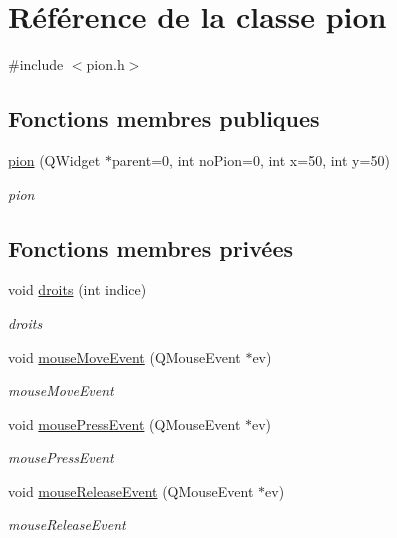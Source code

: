 \hypertarget{classpion}{\section{Référence de la classe pion}
\label{classpion}
}


{\ttfamily \#include $<$pion.\-h$>$}

\subsection*{Fonctions membres publiques}
\begin{DoxyCompactItemize}
\item 
\hyperlink{classpion_af29e3925ea85d612aea7e659254f401b}{pion} (Q\-Widget $\ast$parent=0, int no\-Pion=0, int x=50, int y=50)
\begin{DoxyCompactList}\small\item\em pion \end{DoxyCompactList}\end{DoxyCompactItemize}
\subsection*{Fonctions membres privées}
\begin{DoxyCompactItemize}
\item 
void \hyperlink{classpion_a14da0a4cb182706ced199d4f8d61dcd9}{droits} (int indice)
\begin{DoxyCompactList}\small\item\em droits \end{DoxyCompactList}\item 
void \hyperlink{classpion_a28e0a7d35ac53067f27a00152f221b60}{mouse\-Move\-Event} (Q\-Mouse\-Event $\ast$ev)
\begin{DoxyCompactList}\small\item\em mouse\-Move\-Event \end{DoxyCompactList}\item 
void \hyperlink{classpion_a44680c9f0758100216aaf61f696f8cc5}{mouse\-Press\-Event} (Q\-Mouse\-Event $\ast$ev)
\begin{DoxyCompactList}\small\item\em mouse\-Press\-Event \end{DoxyCompactList}\item 
void \hyperlink{classpion_a3d85aab7adc10d4a9cb7326c7a5e3466}{mouse\-Release\-Event} (Q\-Mouse\-Event $\ast$ev)
\begin{DoxyCompactList}\small\item\em mouse\-Release\-Event \end{DoxyCompactList}\end{DoxyCompactItemize}

